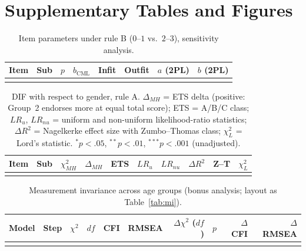 \documentclass[11pt,a4paper]{article}
\begin{document}
\appendix
\section{Supplementary Tables and Figures}

\begin{table}[h]
\centering\small
\caption{Item parameters under rule B ($0$--$1$ vs.\ $2$--$3$), sensitivity analysis.}
\label{tab:irtB}
\begin{tabular}{ll r r rr rr}
\toprule
Item & Sub & $p$ & $b_{\text{CML}}$ & Infit & Outfit & $a$ (2PL) & $b$ (2PL)\\
\midrule
\\
\bottomrule
\end{tabular}
\end{table}

\begin{table}[h]
\centering\small
\caption{DIF with respect to gender, rule A. $\Delta_{MH}$ = ETS delta (positive: Group~2
endorses more at equal total score); ETS = A/B/C class; $LR_u$, $LR_{nu}$ = uniform and
non-uniform likelihood-ratio statistics; $\Delta R^2$ = Nagelkerke effect size with
Zumbo--Thomas class; $\chi^2_L$ = Lord's statistic.
$^{*}p<.05$, $^{**}p<.01$, $^{***}p<.001$ (unadjusted).}
\label{tab:dif}
\begin{tabular}{ll rr l rr rl r}
\toprule
Item & Sub & $\chi^{2}_{MH}$ & $\Delta_{MH}$ & ETS & $LR_u$ & $LR_{nu}$ & $\Delta R^{2}$ & Z--T & $\chi^{2}_{L}$\\
\midrule
\\
\bottomrule
\end{tabular}
\end{table}

\begin{table}[h]
\centering\footnotesize
\setlength{\tabcolsep}{4pt}
\caption{Measurement invariance across age groups (bonus analysis; layout as
Table~\ref{tab:mi}).}
\label{tab:miage}
\begin{tabular}{ll rr rr rl rr}
\toprule
Model & Step & $\chi^{2}$ & $df$ & CFI & RMSEA & $\Delta\chi^{2}$ ($df$) & $p$ & $\Delta$CFI & $\Delta$RMSEA\\
\midrule
\\
\bottomrule
\end{tabular}
\end{table}
\end{document}
